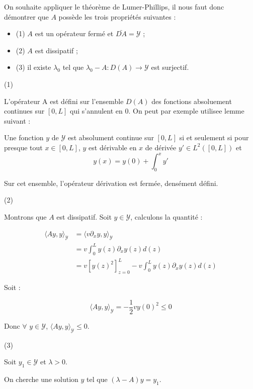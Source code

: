 \documentclass[a4paper]{article}
\begin{document}
\begin{preuve}
	On souhaite appliquer le théorème de Lumer-Phillips, 
	il nous faut donc démontrer que $A$ possède les trois propriétés suivantes :
\begin{itemize}
	\item (1) $A$ est un opérateur fermé et $\bar{D{A}} = \mathscr{Y}$ ;
	\item (2) $A$ est dissipatif ;
	\item (3) il existe $\lambda_0$ tel que $\lambda_0 - A : D(A) \to \mathscr{Y}$ est surjectif.
\end{itemize}

\vspace{0.3cm}
(1)

L'opérateur A est défini sur l'ensemble $D(A)$ des fonctions absoluement continues sur $[0,L]$ qui s'annulent en $0$. 
On peut par exemple utilisee lemme suivant :

\begin{lemme}
	Une fonction $y$ de $\mathscr{Y}$ est absolument continue sur $[0,L]$ si et seulement si pour presque tout $x \in [0,L]$, 
	$y$ est dérivable en $x$ de dérivée $y' \in L^2([0,L])$ et 
	\[ y(x) = y(0) + \int_0^x y' \]
\end{lemme}

Sur cet ensemble, l'opérateur dérivation est fermée, densément défini.

\vspace{0.3cm}
(2)

Montrons que $A$ est dissipatif.
Soit $y \in \mathscr{Y}$, 
calculons la quantité :

\[ \begin{split}
\langle Ay,y \rangle_{\mathscr{Y}} &= \langle v \partial_x y, y \rangle_{\mathscr{Y}}  \\
                     &= v \int_0^L y(z) \partial_x y(z) d(z) \\
					 & = v[y(z)^2]_{z=0}^L - v \int_0^L y(z) \partial_x y(z) d(z)
\end{split} \]

Soit :

\[ \langle Ay,y \rangle_{\mathscr{Y}} = -\frac{1}{2}vy(0)^2 \leq 0 \]

Donc $\forall$ $y \in \mathscr{Y}$, $\langle Ay,y \rangle_{\mathscr{Y}} \leq 0$.


\vspace{0.3cm}
(3)

Soit $y_1 \in \mathscr{Y}$ et $\lambda >0$.

On cherche une solution $y$ tel que $(\lambda -A)y = y_1$.


\end{preuve}
\end{document}
